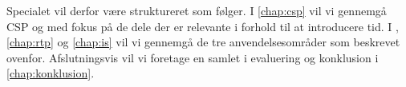 Specialet vil derfor være struktureret som følger. I \autoref{chap:csp} vil vi gennemgå CSP og \pycsp med fokus på de dele der er relevante i forhold til at introducere tid. I , \ref{chap:rtp} og \ref{chap:is} vil vi gennemgå de tre anvendelsesområder som beskrevet ovenfor. Afslutningsvis vil vi foretage en samlet i evaluering og konklusion i \autoref{chap:konklusion}.







% 


\newpage
